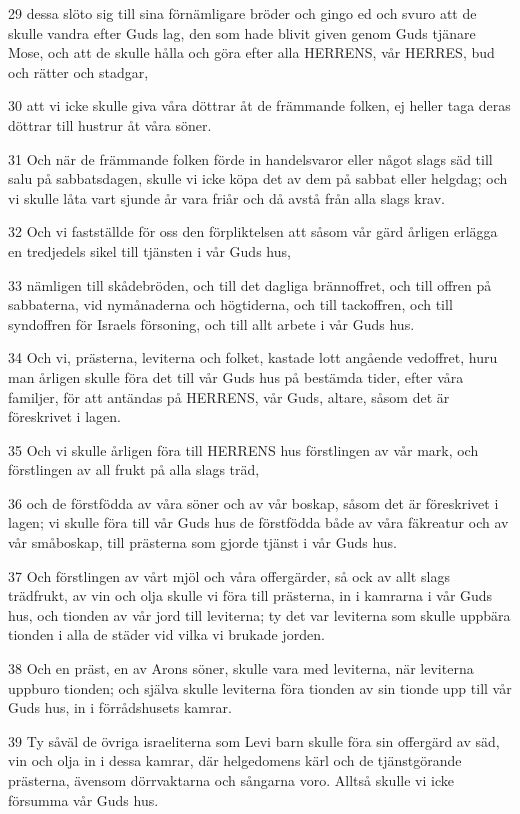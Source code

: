 \par 29 dessa slöto sig till sina förnämligare bröder och gingo ed och svuro att de skulle vandra efter Guds lag, den som hade blivit given genom Guds tjänare Mose, och att de skulle hålla och göra efter alla HERRENS, vår HERRES, bud och rätter och stadgar,
\par 30 att vi icke skulle giva våra döttrar åt de främmande folken, ej heller taga deras döttrar till hustrur åt våra söner.
\par 31 Och när de främmande folken förde in handelsvaror eller något slags säd till salu på sabbatsdagen, skulle vi icke köpa det av dem på sabbat eller helgdag; och vi skulle låta vart sjunde år vara friår och då avstå från alla slags krav.
\par 32 Och vi fastställde för oss den förpliktelsen att såsom vår gärd årligen erlägga en tredjedels sikel till tjänsten i vår Guds hus,
\par 33 nämligen till skådebröden, och till det dagliga brännoffret, och till offren på sabbaterna, vid nymånaderna och högtiderna, och till tackoffren, och till syndoffren för Israels försoning, och till allt arbete i vår Guds hus.
\par 34 Och vi, prästerna, leviterna och folket, kastade lott angående vedoffret, huru man årligen skulle föra det till vår Guds hus på bestämda tider, efter våra familjer, för att antändas på HERRENS, vår Guds, altare, såsom det är föreskrivet i lagen.
\par 35 Och vi skulle årligen föra till HERRENS hus förstlingen av vår mark, och förstlingen av all frukt på alla slags träd,
\par 36 och de förstfödda av våra söner och av vår boskap, såsom det är föreskrivet i lagen; vi skulle föra till vår Guds hus de förstfödda både av våra fäkreatur och av vår småboskap, till prästerna som gjorde tjänst i vår Guds hus.
\par 37 Och förstlingen av vårt mjöl och våra offergärder, så ock av allt slags trädfrukt, av vin och olja skulle vi föra till prästerna, in i kamrarna i vår Guds hus, och tionden av vår jord till leviterna; ty det var leviterna som skulle uppbära tionden i alla de städer vid vilka vi brukade jorden.
\par 38 Och en präst, en av Arons söner, skulle vara med leviterna, när leviterna uppburo tionden; och själva skulle leviterna föra tionden av sin tionde upp till vår Guds hus, in i förrådshusets kamrar.
\par 39 Ty såväl de övriga israeliterna som Levi barn skulle föra sin offergärd av säd, vin och olja in i dessa kamrar, där helgedomens kärl och de tjänstgörande prästerna, ävensom dörrvaktarna och sångarna voro. Alltså skulle vi icke försumma vår Guds hus.

